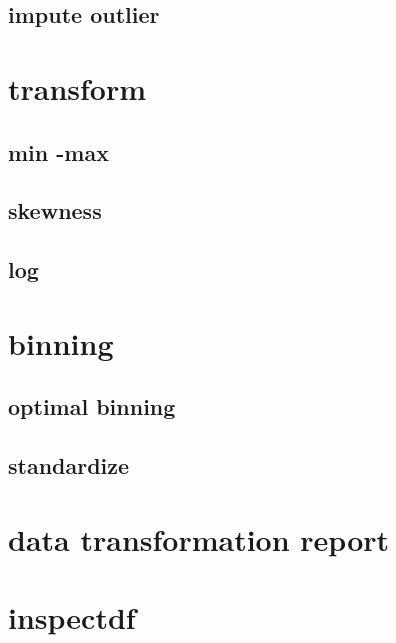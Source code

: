 \documentclass[]{article}
\begin{document}
\hypertarget{impute-outlier}{%
\subsection{impute outlier}\label{impute-outlier}}

\hypertarget{transform}{%
\section{transform}\label{transform}}

\hypertarget{min--max}{%
\subsection{min -max}\label{min--max}}

\hypertarget{skewness}{%
\subsection{skewness}\label{skewness}}

\hypertarget{log}{%
\subsection{log}\label{log}}

\hypertarget{binning}{%
\section{binning}\label{binning}}

\hypertarget{optimal-binning}{%
\subsection{optimal binning}\label{optimal-binning}}

\hypertarget{standardize}{%
\subsection{standardize}\label{standardize}}

\hypertarget{data-transformation-report}{%
\section{data transformation report}\label{data-transformation-report}}

\hypertarget{inspectdf}{%
\section{inspectdf}\label{inspectdf}}
\end{document}
